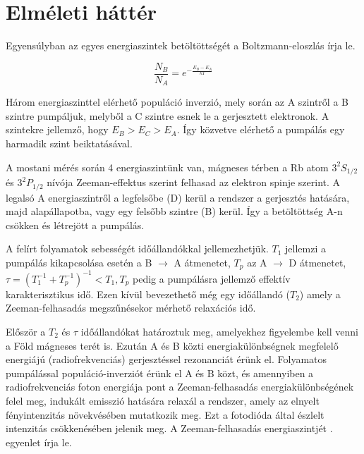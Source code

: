 \documentclass[12pt]{article}
\theoremstyle{plain}
\begin{document}
\section{Elméleti háttér}

\par Egyensúlyban az egyes energiaszintek betöltöttségét a Boltzmann-eloszlás írja le.

\begin{equation}
\label{eq:1}
\frac{N_B}{N_A}= e^{-\frac{E_B-E_A}{kT}}
\end{equation}

\vspace{.3cm}

\par Három energiaszinttel elérhető populáció inverzió, mely során az A szintről a B szintre pumpáljuk, melyből a C szintre esnek le a gerjesztett elektronok. A szintekre jellemző, hogy $E_{B} > E_{C} > E_{A}$. Így közvetve elérhető a pumpálás egy harmadik szint beiktatásával.

\vspace{.5cm}

\par A mostani mérés során 4 energiaszintünk van, mágneses térben a Rb atom $3^2S_{1/2}$ és $3^2P_{1/2}$ nívója Zeeman-effektus szerint felhasad az elektron spinje szerint. A legalsó A energiaszintről a legfelsőbe (D) kerül a rendszer a gerjesztés hatására, majd alapállapotba, vagy egy felsőbb szintre (B) kerül. Így a betöltöttség A-n csökken és létrejött a pumpálás.

\vspace{.5cm}

\par A felírt folyamatok sebességét időállandókkal jellemezhetjük. $T_1$ jellemzi a pumpálás kikapcsolása esetén a B $\rightarrow$ A átmenetet, $T_p$ az A $\rightarrow$ D átmenetet, $\tau = (T_1^{-1}+T_p^{-1})^{-1} < T_1, T_p$ pedig a pumpálásra jellemző effektív karakterisztikus idő. Ezen kívül bevezethető még egy időállandó ($T_2$) amely a Zeeman-felhasadás megszűnésekor mérhető relaxációs idő.

\vspace{.5cm}

\par Először a $T_2$ és $\tau$ időállandókat határoztuk meg, amelyekhez figyelembe kell venni a Föld mágneses terét is. Ezután A és B közti energiakülönbségnek megfelelő energiájú (radiofrekvenciás) gerjesztéssel rezonanciát érünk el. Folyamatos pumpálással populáció-inverziót érünk el A és B közt, és amennyiben a radiofrekvenciás foton energiája pont a Zeeman-felhasadás energiakülönbségének felel meg, indukált emisszió hatására relaxál a rendszer, amely az elnyelt fényintenzitás növekvésében mutatkozik meg. Ezt a fotodióda által észlelt intenzitás csökkenésében jelenik meg. A Zeeman-felhasadás energiaszintjét . egyenlet írja le.
\end{document}
